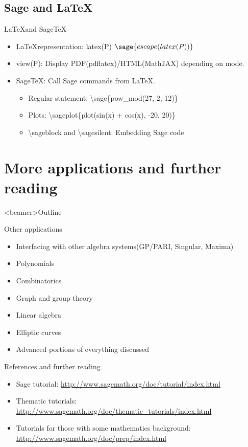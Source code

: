 \documentclass{beamer}
\begin{document}
\subsection{Sage and \LaTeX}
\begin{frame}{\LaTeX and Sage\TeX}
 \begin{itemize}
   \item \LaTeX representation: latex(P) $\sage{escape(latex(P))}$
   \item view(P): Display PDF(pdflatex)/HTML(MathJAX) depending on mode.
   \item Sage\TeX: Call Sage commands from \LaTeX.
   \begin{itemize}
    \item Regular statement: \textbackslash sage\{pow\_mod(27, 2, 12)\}
    \item Plots: \textbackslash sageplot\{plot(sin(x) + cos(x), -20, 20)\}
    \item \textbackslash sageblock and \textbackslash sagesilent: Embedding Sage code
   \end{itemize}
 \end{itemize}
\end{frame}

\section{More applications and further reading}
\begin{frame}<beamer>{Outline}
    \tableofcontents[currentsection, sectionstyle=show/shaded]
\end{frame}

\begin{frame}{Other applications}
 \begin{itemize}
  \item Interfacing with other algebra systems(GP/PARI, Singular, Maxima)
  \item Polynomials
  \item Combinatorics
  \item Graph and group theory
  \item Linear algebra
  \item Elliptic curves
  \item Advanced portions of everything discussed
 \end{itemize}
\end{frame}

\begin{frame}{References and further reading}
 \begin{itemize}
  \item Sage tutorial: \href{http://www.sagemath.org/doc/tutorial/index.html}{http://www.sagemath.org/doc/tutorial/index.html}
  \item Thematic tutorials: \href{http://www.sagemath.org/doc/thematic\_tutorials/index.html}{http://www.sagemath.org/doc/thematic\_tutorials/index.html}
  \item Tutorials for those with some mathematics background: \href{http://www.sagemath.org/doc/prep/index.html}{http://www.sagemath.org/doc/prep/index.html}
 \end{itemize}
\end{frame}
\end{document}
